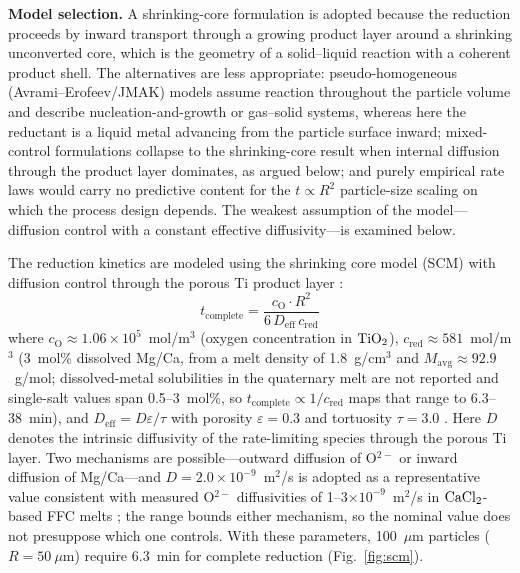 \documentclass[11pt]{article}
\begin{document}
\textbf{Model selection.} A shrinking-core formulation is adopted because the reduction proceeds by inward transport through a growing product layer around a shrinking unconverted core, which is the geometry of a solid--liquid reaction with a coherent product shell. The alternatives are less appropriate: pseudo-homogeneous (Avrami--Erofeev/JMAK) models assume reaction throughout the particle volume and describe nucleation-and-growth or gas--solid systems, whereas here the reductant is a liquid metal advancing from the particle surface inward; mixed-control formulations collapse to the shrinking-core result when internal diffusion through the product layer dominates, as argued below; and purely empirical rate laws would carry no predictive content for the $t \propto R^2$ particle-size scaling on which the process design depends. The weakest assumption of the model---diffusion control with a constant effective diffusivity---is examined below.

The reduction kinetics are modeled using the shrinking core model (SCM) with diffusion control through the porous Ti product layer \cite{levenspiel1999}:
\begin{equation}
\label{eq:scm}
t_{\mathrm{complete}} = \frac{c_{\mathrm{O}} \cdot R^2}{6\,D_{\mathrm{eff}}\,c_{\mathrm{red}}}
\end{equation}
where $c_{\mathrm{O}} \approx 1.06\times10^5$~mol/m$^3$ (oxygen concentration in $\ce{TiO2}$), $c_{\mathrm{red}} \approx 581$~mol/m$^3$ (3~mol\% dissolved Mg/Ca, from a melt density of 1.8~g/cm$^3$ \cite{sato1999} and $M_{\mathrm{avg}} \approx 92.9$~g/mol; dissolved-metal solubilities in the quaternary melt are not reported and single-salt values span 0.5--3~mol\%, so $t_{\mathrm{complete}} \propto 1/c_{\mathrm{red}}$ maps that range to 6.3--38~min), and $D_{\mathrm{eff}} = D\varepsilon/\tau$ with porosity $\varepsilon = 0.3$ and tortuosity $\tau = 3.0$ \cite{fray2000}. Here $D$ denotes the intrinsic diffusivity of the rate-limiting species through the porous Ti layer. Two mechanisms are possible---outward diffusion of O$^{2-}$ or inward diffusion of Mg/Ca---and $D = 2.0\times10^{-9}$~m$^2$/s is adopted as a representative value consistent with measured O$^{2-}$ diffusivities of 1--3$\times10^{-9}$~m$^2$/s in $\ce{CaCl2}$-based FFC melts \cite{fray2000,yan2007}; the range bounds either mechanism, so the nominal value does not presuppose which one controls. With these parameters, 100~$\mu$m particles ($R = 50~\mu$m) require 6.3~min for complete reduction (Fig.~\ref{fig:scm}).
\end{document}
